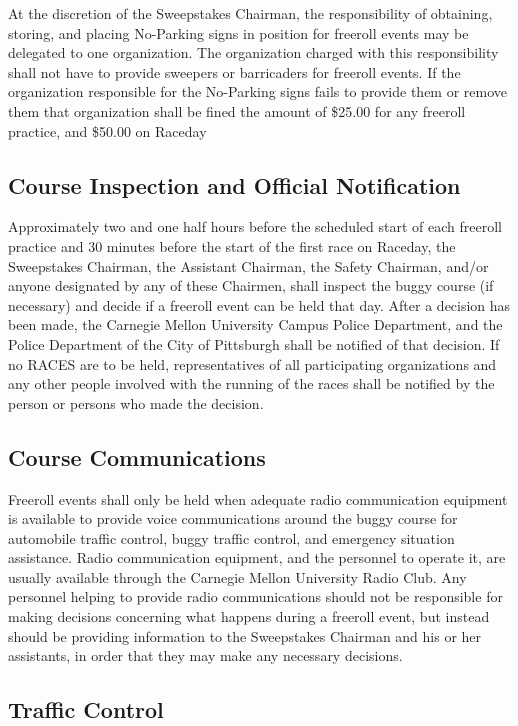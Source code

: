	At the discretion of the Sweepstakes Chairman, the responsibility of obtaining, storing, and placing No-Parking signs in position for freeroll events may be delegated to one organization. The organization charged with this responsibility shall not have to provide sweepers or barricaders for freeroll events. If the organization responsible for the No-Parking signs fails to provide them or remove them that organization shall be fined the amount of \$25.00 for any freeroll practice, and \$50.00 on Raceday

	
\subsection{Course Inspection and Official Notification}

	Approximately two and one half hours before the scheduled start of each freeroll practice and 30 minutes before the start of the first race on Raceday, the Sweepstakes Chairman, the Assistant Chairman, the Safety Chairman, and/or anyone designated by any of these Chairmen, shall inspect the buggy course (if necessary) and decide if a freeroll event can be held that day. After a decision has been made, the Carnegie Mellon University Campus Police Department, and the Police Department of the City of Pittsburgh shall be notified of that decision. If no RACES are to be held, representatives of all participating organizations and any other people involved with the running of the races shall be notified by the person or persons who made the decision.


\subsection{Course Communications}

	Freeroll events shall only be held when adequate radio communication equipment is available to provide voice communications around the buggy course for automobile traffic control, buggy traffic control, and emergency situation assistance. Radio communication equipment, and the personnel to operate it, are usually available through the Carnegie Mellon University Radio Club. Any personnel helping to provide radio communications should not be responsible for making decisions concerning what happens during a freeroll event, but instead should be providing information to the Sweepstakes Chairman and his or her assistants, in order that they may make any necessary decisions.
	
	
\subsection{Traffic Control}

